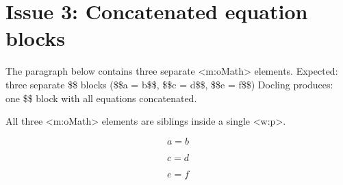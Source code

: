 \documentclass[11pt,a4paper]{article}
\begin{document}
\section{\textbf{Issue 3: Concatenated equation blocks}}

The paragraph below contains three separate <m:oMath> elements.
Expected: three separate \$\$ blocks (\$\$a = b\$\$, \$\$c = d\$\$, \$\$e = f\$\$)
Docling produces: one \$\$ block with all equations concatenated.

All three <m:oMath> elements are siblings inside a single <w:p>.

$$a=b$$

$$c=d$$

$$e=f$$
\end{document}
